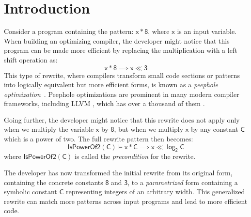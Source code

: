 \documentclass[review, anonymous, acmsmall]{acmart}
\newcommand{\blockmath}[1]{\[\mathsf{#1}\]}
\newcommand{\inline}[1]{$\mathsf{#1}$}
\begin{document}

\fi

\maketitle

\section{Introduction}

Consider a program containing the pattern: \inline{x * 8}, where \inline{x} is an input variable. When building an optimizing compiler, the developer might notice that this program can be made more efficient by replacing the multiplication with a left shift operation as:
\[\mathsf{x * 8  \implies x \ll 3}\]
This type of rewrite, where compilers transform small code sections or patterns into logically equivalent but more efficient forms, is known as a \textit{peephole optimization}~\cite{mckeeman_peephole_1965}. Peephole optimizations are prominent in many modern compiler frameworks, including LLVM \cite{lattner_llvm_2004}, which has over a thousand of them \cite{menendez_termination-checking_2016}.

Going further, the developer might notice that this rewrite does not apply only when we multiply the variable \inline{x} by \inline{8}, but when we multiply \inline{x} by any constant \inline{C} which is a power of two. The full rewrite pattern then becomes:
    \blockmath{IsPowerOf2(C) \models x * C \implies x \ll \log_2 C}
where $\mathsf{IsPowerOf2(C)}$ is called the \textit{precondition} for the rewrite.

The developer has now transformed the initial rewrite from its original form,
containing the concrete constants \inline{8} and \inline{3}, to a \textit{parametrized} form containing a symbolic constant \inline{C} representing integers of an arbitrary width.
This generalized rewrite can match more patterns across input programs and lead to more efficient code.
\end{document}
